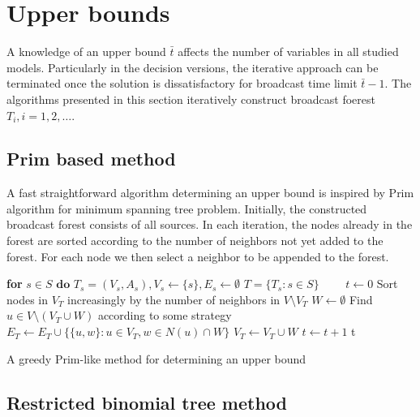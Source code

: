 \section{Upper bounds}

A knowledge of an upper bound $\bar{t}$ affects the number of variables in all studied models. 
Particularly in the decision versions, the iterative approach can be terminated once the solution is dissatisfactory for broadcast time limit $\bar{t}-1$.
The algorithms presented in this section iteratively construct broadcast foerest $T_i, i=1,2,\dots$.
\subsection{Prim based method}

A fast straightforward algorithm determining an upper bound is inspired by Prim algorithm for minimum spanning tree problem.
Initially, the constructed broadcast forest consists of all sources. 
In each iteration, the nodes already in the forest are sorted according to the number of neighbors not yet added to the forest.
For each node we then select a neighbor to be appended to the forest.
\begin{algorithm}[]
\textbf{for }$s\in S\textbf{ do }T_s=(V_s,A_s), V_s\leftarrow \{s\}, E_s\leftarrow\emptyset$\;
$T=\{T_s:s\in S\}$\ ~~~
$t\leftarrow 0$\;
 {
	Sort nodes in $V_T$ increasingly by the number of neighbors in $V\setminus V_T$\;
	$W\leftarrow\emptyset$\;
	 {
		Find $u\in V\setminus (V_T\cup W)$ according to some strategy\; 	
	}
	$E_T\leftarrow E_T\cup \{\{u,w\}: u\in V_T, w\in N(u)\cap W\}$\;
	$V_T\leftarrow V_T\cup W$\;
	$t\leftarrow t+1$\;
}
\Return t\;
 \caption{A greedy Prim-like method for determining an upper bound}
\label{alg:match}
\end{algorithm}

\subsection{Restricted binomial tree method}

